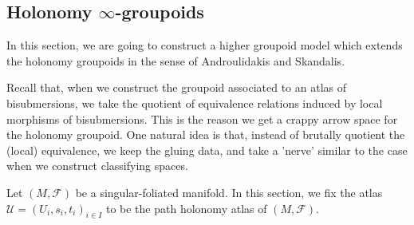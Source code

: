 \documentclass[12pt]{amsart}
\theoremstyle{definition}
\theoremstyle{remark}
\numberwithin{equation}{section}
\newcommand{\CF}{{\mathcal F}}
\newcommand{\1}{{\mathbb{1}}}
\begin{document}
\subsection{Holonomy $\infty$-groupoids}

In this section, we are going to construct a higher groupoid model which extends the holonomy groupoids in the sense of Androulidakis and Skandalis.

Recall that, when we construct the groupoid associated to an atlas of bisubmersions, we take the quotient of equivalence relations induced by local morphisms of bisubmersions. This is the reason we get a crappy arrow space for the holonomy groupoid. One natural idea is that, instead of brutally quotient the (local) equivalence, we keep the gluing data, and take a 'nerve' similar to the case when we construct classifying spaces.

Let $(M, \CF)$ be a singular-foliated manifold. In this section, we fix the atlas $\mathcal{U}= (U_i, s_i, t_i)_{i\in I}$ to be the path holonomy atlas of $(M, \CF)$.
\end{document}

